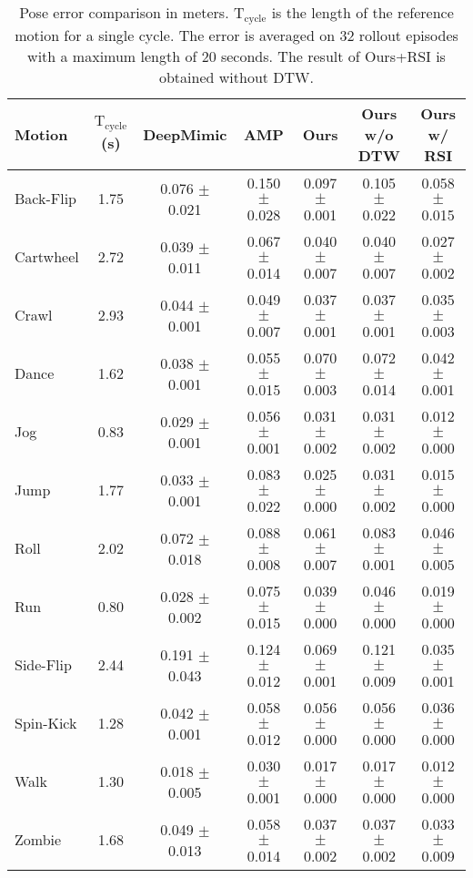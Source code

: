 \begin{table}[h]
\caption{{Pose error comparison in meters.  $\textrm{T}_\textrm{cycle}$ is the length of the reference motion for a single cycle. The error is averaged on 32 rollout episodes with a maximum length of 20 seconds. The result of Ours+RSI is obtained without DTW.}}
\fontsize{8}{9}\selectfont
\label{tab: rsi_poseerror}
\begin{center}
\begin{tabular}{lcccccc}
\toprule
Motion & $\textrm{T}_\textrm{cycle}$(s) &  DeepMimic & AMP & Ours  & Ours w/o DTW  & Ours w/ RSI\\
\midrule
Back-Flip & 1.75 & 0.076 $\pm$ 0.021 & 0.150 $\pm$ 0.028 & 0.097 $\pm$ 0.001 & 0.105 $\pm$ 0.022 &0.058$\pm$ 0.015\\
Cartwheel & 2.72 & 0.039 $\pm$ 0.011 & 0.067 $\pm$ 0.014 & 0.040 $\pm$ 0.007 & 0.040 $\pm$ 0.007  &0.027$\pm$ 0.002 \\
Crawl & 2.93 & 0.044 $\pm$ 0.001 & 0.049 $\pm$ 0.007 & 0.037 $\pm$ 0.001 & 0.037 $\pm$ 0.001 &0.035$\pm$ 0.003\\
Dance & 1.62 & 0.038 $\pm$ 0.001 & 0.055 $\pm$ 0.015 & 0.070 $\pm$ 0.003 & 0.072 $\pm$ 0.014 & 0.042$\pm$ 0.001\\
Jog & 0.83 & 0.029 $\pm$ 0.001 & 0.056 $\pm$ 0.001 & 0.031 $\pm$ 0.002 & 0.031 $\pm$ 0.002 &0.012$\pm$ 0.000\\
Jump & 1.77 & 0.033 $\pm$ 0.001 & 0.083 $\pm$ 0.022 & 0.025 $\pm$ 0.000 & 0.031 $\pm$ 0.002 & 0.015$\pm$ 0.000\\
Roll & 2.02 & 0.072 $\pm$ 0.018 & 0.088 $\pm$ 0.008 & 0.061 $\pm$ 0.007 & 0.083 $\pm$ 0.001 & 0.046$\pm$ 0.005\\
Run & 0.80 & 0.028 $\pm$ 0.002 & 0.075 $\pm$ 0.015 & 0.039 $\pm$ 0.000 & 0.046 $\pm$ 0.000 & 0.019$\pm$ 0.000\\
Side-Flip & 2.44 & 0.191 $\pm$ 0.043 & 0.124 $\pm$ 0.012 & 0.069 $\pm$ 0.001 & 0.121 $\pm$ 0.009 & 0.035$\pm$ 0.001\\
Spin-Kick & 1.28 & 0.042 $\pm$ 0.001 & 0.058 $\pm$ 0.012 & 0.056 $\pm$ 0.000 & 0.056 $\pm$ 0.000& 0.036$\pm$ 0.000\\
Walk & 1.30 & 0.018 $\pm$ 0.005 & 0.030 $\pm$ 0.001 &  0.017 $\pm$ 0.000 &  0.017 $\pm$ 0.000 &0.012$\pm$ 0.000\\
Zombie & 1.68 & 0.049 $\pm$ 0.013 & 0.058 $\pm$ 0.014 & 0.037 $\pm$ 0.002 & 0.037 $\pm$ 0.002 & 0.033$\pm$ 0.009\\
\bottomrule
\end{tabular}
\end{center}
\end{table}